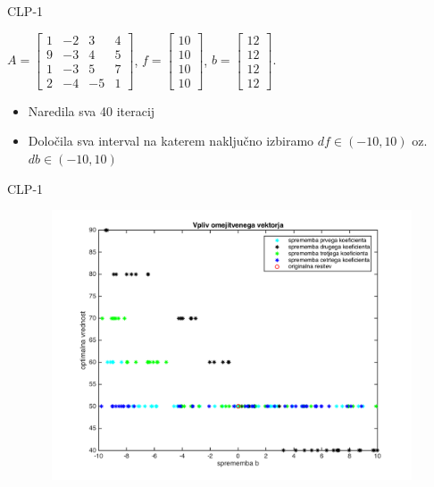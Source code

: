 \documentclass[t]{beamer}
\begin{document}
\begin{frame}{CLP-1}
\begin{center}
$ A = \begin{bmatrix}
  1 & -2 & 3 & 4 \\
  9 & -3 & 4 & 5 \\
  1 & -3 & 5 & 7 \\
  2 & -4 & -5 & 1  
\end{bmatrix} $, $f=\begin{bmatrix} 10 \\10 \\10\\10 \end{bmatrix}$, $b=\begin{bmatrix} 12 \\12 \\12\\12 \end{bmatrix}.$
\end{center}
\begin{itemize}
\item Naredila sva 40 iteracij
\item Določila sva interval na katerem naključno izbiramo $df \in (-10,10)$ oz. $db \in (-10,10)$
\end{itemize}
\end{frame}

\begin{frame}{CLP-1}
\begin{figure}[h]
\includegraphics[width=11.2cm,height=8cm]{spremembe_b.png}
\end{figure}
\end{frame}
\end{document}
